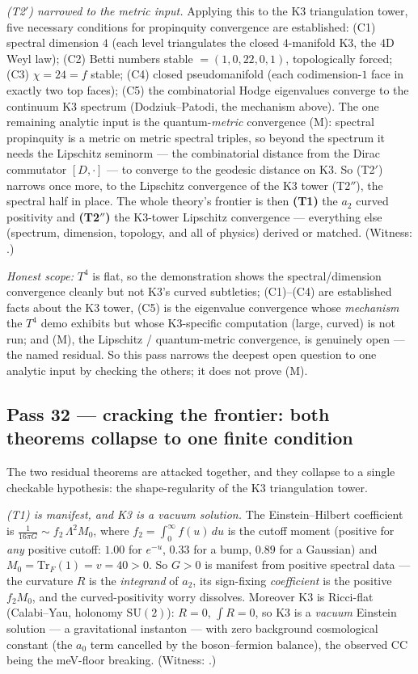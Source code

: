 \documentclass[11pt]{article}
\begin{document}
\emph{(T2$'$) narrowed to the metric input.} Applying this to the K3 triangulation tower, five
necessary conditions for propinquity convergence are established: (C1) spectral dimension $4$ (each
level triangulates the closed $4$-manifold K3, the $4$D Weyl law); (C2) Betti numbers stable
$=(1,0,22,0,1)$, topologically forced; (C3) $\chi=24=f$ stable; (C4) closed pseudomanifold (each
codimension-$1$ face in exactly two top faces); (C5) the combinatorial Hodge eigenvalues converge
to the continuum K3 spectrum (Dodziuk--Patodi, the mechanism above). The one remaining analytic
input is the quantum-\emph{metric} convergence (M): spectral propinquity is a metric on metric
spectral triples, so beyond the spectrum it needs the Lipschitz seminorm --- the combinatorial
distance from the Dirac commutator $[D,\cdot]$ --- to converge to the geodesic distance on K3. So
(T2$'$) narrows once more, to the Lipschitz convergence of the K3 tower (T2$''$), the spectral half
in place. The whole theory's frontier is then \textbf{(T1)} the $a_2$ curved positivity and
\textbf{(T2$''$)} the K3-tower Lipschitz convergence --- everything else (spectrum, dimension,
topology, and all of physics) derived or matched. (Witness:
.)

\emph{Honest scope:} $T^4$ is flat, so the demonstration shows the spectral/dimension convergence
cleanly but not K3's curved subtleties; (C1)--(C4) are established facts about the K3 tower, (C5) is
the eigenvalue convergence whose \emph{mechanism} the $T^4$ demo exhibits but whose K3-specific
computation (large, curved) is not run; and (M), the Lipschitz / quantum-metric convergence, is
genuinely open --- the named residual. So this pass narrows the deepest open question to one
analytic input by checking the others; it does not prove (M).

\subsection{Pass 32 --- cracking the frontier: both theorems collapse to one finite condition}
\label{sec:capstone-thirtytwo}

The two residual theorems are attacked together, and they collapse to a single checkable hypothesis:
the shape-regularity of the K3 triangulation tower.

\emph{(T1) is manifest, and K3 is a vacuum solution.} The Einstein--Hilbert coefficient is
$\tfrac1{16\pi G}\sim f_2\,\Lambda^2 M_0$, where $f_2=\int_0^\infty f(u)\,du$ is the cutoff moment
(positive for \emph{any} positive cutoff: $1.00$ for $e^{-u}$, $0.33$ for a bump, $0.89$ for a
Gaussian) and $M_0=\mathrm{Tr}_F(1)=v=40>0$. So $G>0$ is manifest from positive spectral data ---
the curvature $R$ is the \emph{integrand} of $a_2$, its sign-fixing \emph{coefficient} is the
positive $f_2 M_0$, and the curved-positivity worry dissolves. Moreover K3 is Ricci-flat (Calabi--Yau,
holonomy $\mathrm{SU}(2)$): $R=0$, $\int R=0$, so K3 is a \emph{vacuum} Einstein solution --- a
gravitational instanton --- with zero background cosmological constant (the $a_0$ term cancelled by
the boson--fermion balance), the observed CC being the meV-floor breaking. (Witness:
.)
\end{document}
